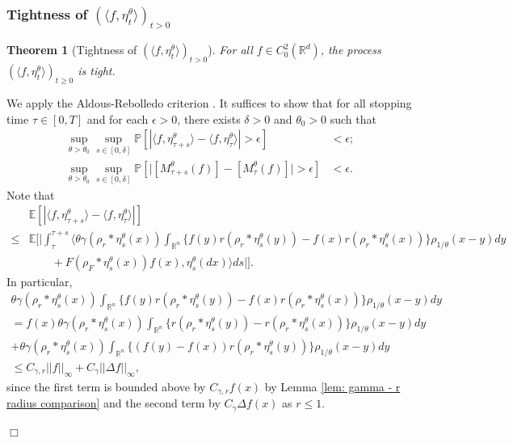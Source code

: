 \documentclass[12pt]{article}
\newenvironment {proof}{{\noindent\bf Proof }}{\hfill $\Box$ \medskip}
\newtheorem{theorem}{Theorem}[section]
\begin{document}
\subsubsection{Tightness of $(\langle f, \eta^{\theta}_t \rangle )_{t>0}$}
\begin{theorem}[Tightness of $(\langle f, \eta^{\theta}_t \rangle )_{t>0}$]
    \label{teo: Tightness of real-valued projections}
For all $f \in C^{2}_{0}(\mathbb{R}^d)$, 
the process
$(\langle f, \eta^{\theta}_t \rangle)_{t \geq 0}$ is tight.
\end{theorem}
\begin{proof}
We apply the Aldous-Rebolledo criterion \cite{rebolledo:1980}.
It suffices to show that for all stopping time
$\tau \in [0,T]$ and for each $\epsilon>0$, there exists $\delta>0$ and $\theta_0>0$ such that 
\begin{equation}
\begin{aligned}
\sup_{\theta > \theta_0}
\sup_{s \in [0, \delta]}
\mathbb{P}\left[\left| \langle f, \eta^{\theta}_{\tau+s}\rangle
                        - \langle f, \eta^{\theta}_{\tau}\rangle
                \right|> \epsilon \right]
                & < \epsilon;\\
\sup_{\theta > \theta_0}
\sup_{s \in [0, \delta]}
\mathbb{P}\left[\big| [M^{\theta}_{\tau+s}(f)] 
                        - [M^{\theta}_{\tau}(f)] \big|
                        > \epsilon\right]
                & < \epsilon.
\end{aligned}    
\end{equation}
Note that
\begin{equation}
\begin{aligned}
 & \mathbb{E}\left[\left| \langle f, \eta^{\theta}_{\tau+s}\rangle - \langle f, \eta^{\theta}_{\tau}\rangle \right|\right] \\
\leq & \mathbb{E}\Bigg[\bigg| \int_{\tau}^{\tau+s}\bigg\langle \theta\gamma(\rho_{r}*\eta^{\theta}_{s}(x)) \int_{\mathbb{R}^n} \big\{f(y)r(\rho_{r}*\eta^{\theta}_{s}(y))-f(x)r(\rho_{r}*\eta^{\theta}_{s}(x))\big\}\rho_{1/\theta}(x-y)dy \\
& \qquad + F(\rho_{F}*\eta^{\theta}_{s}(x)) f(x),\eta^{\theta}_{s}(dx)  \bigg\rangle ds \bigg|\Bigg].
\end{aligned}
\end{equation}
In particular,
\begin{multline}
 \theta\gamma(\rho_{r}*\eta^{\theta}_{s}(x))\int_{\mathbb{R}^n} \big\{f(y)r(\rho_{r}*\eta^{\theta}_{s}(y))-f(x)r(\rho_{r}*\eta^{\theta}_{s}(x))\big\}\rho_{1/\theta}(x-y)dy \\
 =  f(x)\theta\gamma(\rho_{r}*\eta^{\theta}_{s}(x))\int_{\mathbb{R}^n} \big\{r(\rho_{r}*\eta^{\theta}_{s}(y))-r(\rho_{r}*\eta^{\theta}_{s}(x))\big\}\rho_{1/\theta}(x-y)dy\\
 + \theta\gamma(\rho_{r}*\eta^{\theta}_{s}(x))\int_{\mathbb{R}^n} \big\{(f(y)-f(x))r(\rho_{r}*\eta^{\theta}_{s}(y))\big\}\rho_{1/\theta}(x-y)dy\\
 \leq C_{\gamma,r}||f||_{\infty} + C_{\gamma}||\Delta f||_{\infty},
\end{multline}
since the first term is bounded above by $C_{\gamma,r}f(x)$ by Lemma \ref{lem: gamma - r radius comparison}
and the second term by $C_{\gamma} \Delta f(x)$ as $r \leq 1$.


\end{proof}
\end{document}
